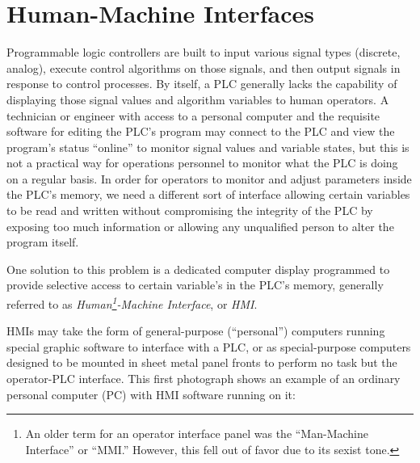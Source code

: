 


















\filbreak
\section{Human-Machine Interfaces}

Programmable logic controllers are built to input various signal types (discrete, analog), execute control algorithms on those signals, and then output signals in response to control processes.  By itself, a PLC generally lacks the capability of displaying those signal values and algorithm variables to human operators.  A technician or engineer with access to a personal computer and the requisite software for editing the PLC's program may connect to the PLC and view the program's status ``online'' to monitor signal values and variable states, but this is not a practical way for operations personnel to monitor what the PLC is doing on a regular basis.  In order for operators to monitor and adjust parameters inside the PLC's memory, we need a different sort of interface allowing certain variables to be read and written without compromising the integrity of the PLC by exposing too much information or allowing any unqualified person to alter the program itself.

One solution to this problem is a dedicated computer display programmed to provide selective access to certain variable's in the PLC's memory, generally referred to as \textit{Human\footnote{An older term for an operator interface panel was the ``Man-Machine Interface'' or ``MMI.''  However, this fell out of favor due to its sexist tone.}-Machine Interface}, or \textit{HMI}.    

HMIs may take the form of general-purpose (``personal'') computers running special graphic software to interface with a PLC, or as special-purpose computers designed to be mounted in sheet metal panel fronts to perform no task but the operator-PLC interface.  This first photograph shows an example of an ordinary personal computer (PC) with HMI software running on it:

